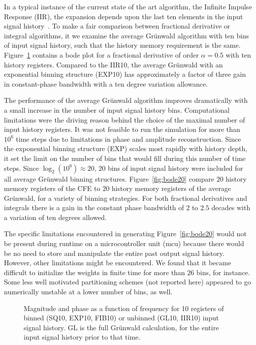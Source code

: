 In a typical instance of the current state of the art algorithm, the
Infinite Impulse Response (IIR), the expansion depends upon the
last ten elements in the input signal history~\cite{Chen:04a}. To make a
fair comparison between fractional derivative or integral algorithms,
it we examine the average Gr{\"u}nwald algorithm with ten bins of input
signal history, such that the history memory requirement is the
same. Figure~\ref{fig:bode10p05} contains a bode plot for a fractional
derivative of order $\alpha=0.5$ with ten history registers. Compared
to the IIR10, the average Gr{\"u}nwald with an exponential binning
structure (EXP10) has approximately a factor of three gain in
constant-phase bandwidth with a ten degree variation allowance. 

The performance of the average Gr{\"u}nwald algorithm improves
dramatically with a small increase in the number of input signal
history bins. Computational limitations were the driving reason behind the choice of the maximal number of input history registers. It was not feasible to run the simulation for more than $10^6$ time steps due to limitations in phase and amplitude reconstruction.  Since the exponential binning structure (EXP) scales most rapidly with history depth, it set the limit on the number of bins that would fill during this number of time steps. Since $\log_2(10^6)\approx 20$, $20$ bins of input signal history were included for all average Gr{\"u}nwald binning structures. Figure~\ref{fig:bode20} compare $20$
history memory registers of the CFE to $20$ history memory
registers of the average Gr{\"u}nwald, for a variety of binning
strategies. For both fractional
derivatives and integrals there is a gain in the constant phase
bandwidth of $2$ to $2.5$ decades with a variation of ten degrees allowed.

The specific limitations encountered in generating Figure~\ref{fig:bode20} would not be present during runtime on a microcontroller unit (mcu) because there would be no need to store and manipulate the entire past output signal history. However, other limitations might be encountered. We found that it became difficult to initialize the weights in finite time for more than $26$ bins, for instance. Some less well motivated partitioning schemes (not reported here) appeared to go numerically unstable at a lower number of bins, as well. 

\begin{figure}
\label{fig:bode10p05}
\caption{Magnitude and phase as a function of frequency for 10
  registers of binned (SQ10, EXP10, FIB10) or unbinned (GL10, IIR10)
  input signal history. GL is the full Gr{\"u}nwald calculation, for the
  entire input signal history prior to that time.}
\end{figure}

